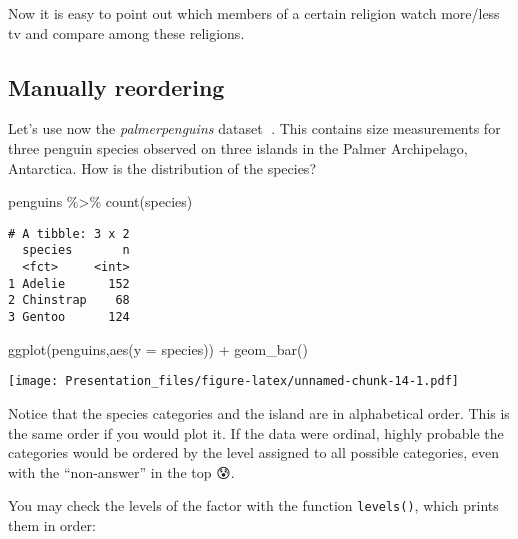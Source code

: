 \documentclass[
]{article}
\newenvironment{Shaded}{\begin{snugshade}}{\end{snugshade}}
\newcommand{\AttributeTok}[1]{\textcolor[rgb]{0.77,0.63,0.00}{#1}}
\newcommand{\FunctionTok}[1]{\textcolor[rgb]{0.00,0.00,0.00}{#1}}
\newcommand{\NormalTok}[1]{#1}
\newcommand{\SpecialCharTok}[1]{\textcolor[rgb]{0.00,0.00,0.00}{#1}}
\begin{document}
Now it is easy to point out which members of a certain religion watch
more/less tv and compare among these religions.

\hypertarget{manually-reordering}{%
\subsection{Manually reordering}\label{manually-reordering}}

Let's use now the \emph{palmerpenguins} dataset 🐧. This contains size
measurements for three penguin species observed on three islands in the
Palmer Archipelago, Antarctica. How is the distribution of the species?

\begin{Shaded}
\begin{Highlighting}[]
\NormalTok{penguins }\SpecialCharTok{\%\textgreater{}\%}
  \FunctionTok{count}\NormalTok{(species)}
\end{Highlighting}
\end{Shaded}

\begin{verbatim}
# A tibble: 3 x 2
  species       n
  <fct>     <int>
1 Adelie      152
2 Chinstrap    68
3 Gentoo      124
\end{verbatim}

\begin{Shaded}
\begin{Highlighting}[]
  \FunctionTok{ggplot}\NormalTok{(penguins,}\FunctionTok{aes}\NormalTok{(}\AttributeTok{y =}\NormalTok{ species)) }\SpecialCharTok{+}
  \FunctionTok{geom\_bar}\NormalTok{() }
\end{Highlighting}
\end{Shaded}

\texttt{[image: Presentation\_files/figure-latex/unnamed-chunk-14-1.pdf]}

Notice that the species categories and the island are in alphabetical
order. This is the same order if you would plot it. If the data were
ordinal️, highly probable the categories would be ordered by the level
assigned to all possible categories, even with the ``non-answer'' in the
top 😰.

You may check the levels of the factor with the function
\texttt{levels()}, which prints them in order:

\begin{Shaded}
\end{Shaded}
\end{document}
